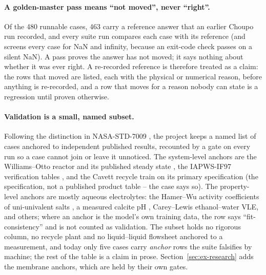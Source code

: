\documentclass[11pt,a4paper]{article}
\begin{document}
\paragraph{A golden-master pass means ``not moved'', never ``right''.}
Of the 480 runnable cases, 463 carry a reference answer that an earlier
Choupo run recorded, and every suite run compares each case with its
reference (and screens every case for NaN and infinity, because an
exit-code check passes on a silent NaN).  A pass proves the answer has not
moved; it says nothing about whether it was ever right.  A re-recorded
reference is therefore treated as a claim: the rows that moved are listed,
each with the physical or numerical reason, before anything is re-recorded,
and a row that moves for a reason nobody can state is a regression until
proven otherwise.

\paragraph{Validation is a small, named subset.}  Following the distinction
in NASA-STD-7009 \citep{nasa7009}, the project keeps a named list of cases
anchored to independent published results, recounted by a gate on every
run so a case cannot join or leave it unnoticed.  The system-level anchors
are the Williams--Otto reactor and its published steady state
\citep{williams1960}, the IAPWS-IF97 verification tables \citep{wagner2000},
and the Cavett recycle train on its primary specification (the
specification, not a published product table -- the case says so).  The
property-level anchors are mostly aqueous electrolytes: the Hamer--Wu
activity coefficients of uni-univalent salts \citep{hamer1972}, a measured
calcite pH \citep{plummer1982}, Carey--Lewis ethanol--water VLE, and
others; where an anchor is the model's own training data, the row says
``fit-consistency'' and is not counted as validation.  The subset holds no
rigorous column, no recycle plant and no liquid--liquid flowsheet anchored
to a measurement, and today only five cases carry \emph{anchor} rows the
suite falsifies by machine; the rest of the table is a claim in prose.
Section~\ref{sec:ex-research} adds the membrane anchors, which are held by
their own gates.
\end{document}
